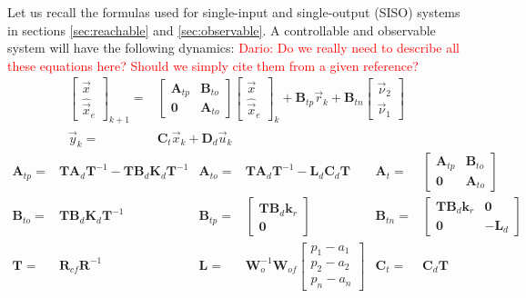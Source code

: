 \documentclass[runningheads,a4paper]{llncs}
\newcommand{\mat}[1]{\boldsymbol{#1}}
\begin{document}
Let us recall the formulas used for single-input and single-output (SISO) systems 
in sections \ref{sec:reachable} and \ref{sec:observable}.
A controllable and observable system will have the following dynamics:
\textcolor{red}{Dario: Do we really need to describe all these equations here?
Should we simply cite them from a given reference?}
%
\begin{align}
\label{eq:observer_LTI_cf}
\left [\begin{array}{c}\vec{x}\\ \hat{\vec{x}}_e \end{array}\right]_{k+1}
=&\left [\begin{array}{cc}\mat{A}_{tp}&\mat{B}_{to}\\ \mat{0}&\mat{A}_{to}\end{array}\right]
\left [\begin{array}{c}\vec{x}\\ \hat{\vec{x}}_e \end{array}\right]_k
+\mat{B}_{tp} \vec{r}_k
+\mat{B}_{tn}\left [\begin{array}{c}\vec{\nu}_2\\ \vec{\nu}_1\end{array}\right]\\
\vec{y}_k=&\mat{C}_{t}\vec{x}_k + \mat{D}_{d}\vec{u}_k\nonumber
\end{align}
\begin{align*}
\mat{A}_{tp}=&\mat{T}\mat{A}_d\mat{T}^{-1}-\mat{T}\mat{B}_d\mat{K}_d\mat{T}^{-1}&
\mat{A}_{to}=&\mat{T}\mat{A}_d\mat{T}^{-1}-\mat{L}_d\mat{C}_d\mat{T}&
\mat{A}_t=&\left [\begin{array}{cc}\mat{A}_{tp}&\mat{B}_{to}\\ \mat{0}&\mat{A}_{to}\end{array}\right]\\
\mat{B}_{to}=&\mat{T}\mat{B}_d\mat{K}_d\mat{T}^{-1}&
\mat{B}_{tp}=&\left[\begin{array}{c}\mat{T}\mat{B}_d\mat{k}_r\\\mat{0}\end{array}\right]&
\mat{B}_{tn}=&\left[\begin{array}{cc}\mat{T}\mat{B}_d\mat{k}_r&\mat{0}\\\mat{0}&-\mat{L}_d\end{array}\right]\\
\mat{T}=&\mat{R}_{cf}\mat{R}^{-1}&
\mat{L}=&\mat{W}_o^{-1}\mat{W}_{of} \left[ \begin{array}{c}p_1-a_1\\p_2-a_2\\p_n-a_n\end{array}\right]&
\mat{C}_t=&\mat{C}_d\mat{T}
\end{align*}
\end{document}
